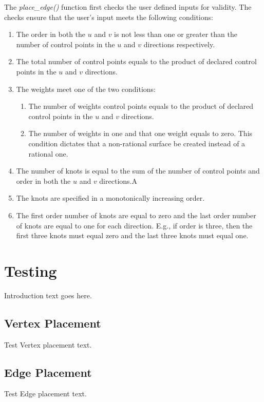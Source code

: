\documentclass[a4paper, 12pt]{article}
\begin{document}
The \emph{place\_edge()} function first checks the user defined inputs
for validity. The checks ensure that the user's input meets the 
following conditions:
\begin{enumerate}
  \item The order in both the $u$ and $v$ is not less than one or greater than
      the number of control points in the $u$ and $v$ directions respectively. 
  \item The total number of control points equals to the product of 
      declared control points in the $u$ and $v$ directions.
  \item The weights meet one of the two conditions:
  \begin{enumerate}
    \item The number of weights control points equals to the product of 
        declared control points in the $u$ and $v$ directions.
    \item The number of weights in one and that one weight equals to zero. 
        This condition dictates that a non-rational surface be created 
        instead of a rational one.
  \end{enumerate}
  \item The number of knots is equal to the sum of the number of control points
      and order in both the $u$ and $v$ directions.A
  \item The knots are specified in a monotonically increasing order. 
  \item The first order number of knots are equal to zero and the last order number 
      of knots are equal to one for each direction. 
      E.g., if order is three, then the first three
      knots must equal zero and the last three knots must equal one.
\end{enumerate}

\section{Testing} \label{sec:testing}
Introduction text goes here.

\subsection{Vertex Placement} \label{subsec:vertexTest}
Test Vertex placement text.

\subsection{Edge Placement} \label{subsec:edgeTest}
Test Edge placement text.
\end{document}
